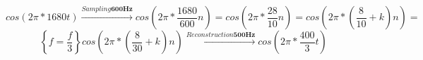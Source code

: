 \documentclass{article}
\begin{document}
\begin{enumerate}
\begin{enumerate}
                \begin{displaymath}
                    cos(2\pi*1680t) \xrightarrow[]{Sampling \textbf{600Hz}} cos(2\pi*\frac{1680}{600}n)
                    =
                    cos(2\pi*\frac{28}{10}n)
                    =
                    cos(2\pi*(\frac{8}{10}+k)n)
                    =
                \end{displaymath}
                \begin{displaymath}
                    \left\{ f=\frac{f}{3} \right\} cos(2\pi*(\frac{8}{30}+k)n)
                    \xrightarrow[]{Reconstruction \textbf{500Hz}} cos(2\pi*\frac{400}{3}t)
                \end{displaymath}
        \end{enumerate}
    \end{enumerate}
\end{document}
